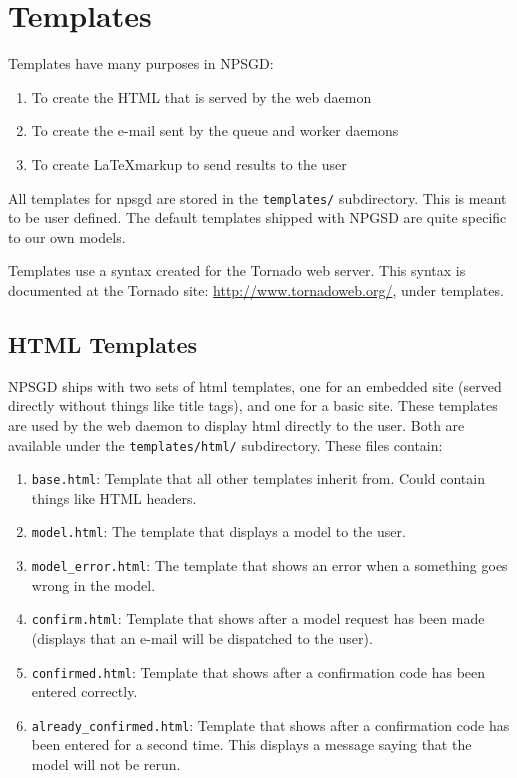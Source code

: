 \documentclass{article}
\newcommand{\mpath}[1]{\texttt{#1}}
\begin{document}
\section{Templates}
Templates have many purposes in NPSGD:
\begin{enumerate}
    \item To create the HTML that is served by the web daemon
    \item To create the e-mail sent by the queue and worker daemons
    \item To create \LaTeX markup to send results to the user
\end{enumerate}

All templates for npsgd are stored in the \mpath{templates/} subdirectory. This
is meant to be user defined. The default templates shipped with NPGSD are quite
specific to our own models.

Templates use a syntax created for the Tornado web server. This syntax is
documented at the Tornado site: \url{http://www.tornadoweb.org/}, under
templates.

\subsection{HTML Templates}
NPSGD ships with two sets of html templates, one for an embedded site (served
directly without things like title tags), and one for a basic site. These
templates are used by the web daemon to display html directly to the user. Both are
available under the \mpath{templates/html/} subdirectory. These files contain:
\begin{enumerate}
    \item \texttt{base.html}: Template that all other templates inherit from.
    Could contain things like HTML headers.

    \item \texttt{model.html}: The template that displays a model to the user.

    \item \texttt{model\_error.html}: The template that shows an error when a
    something goes wrong in the model.

    \item \texttt{confirm.html}: Template that shows after a model request has
    been made (displays that an e-mail will be dispatched to the user).

    \item \texttt{confirmed.html}: Template that shows after a confirmation code
    has been entered correctly.

    \item \texttt{already\_confirmed.html}: Template that shows after a
    confirmation code has been entered for a second time. This displays a
    message saying that the model will not be rerun.
\end{enumerate}
\end{document}
